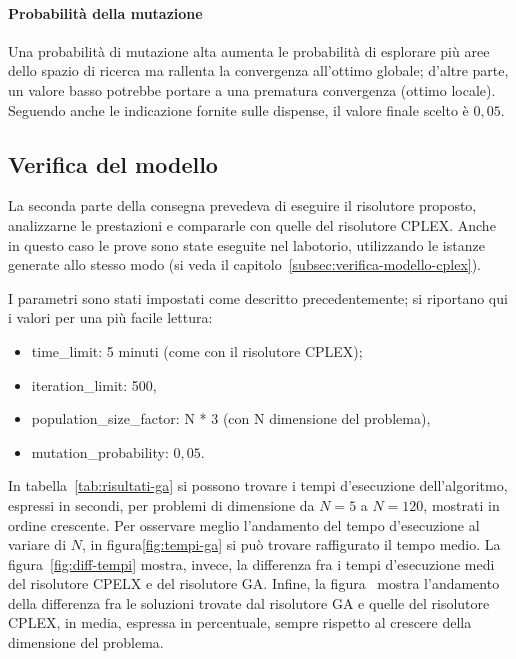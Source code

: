 \paragraph{Probabilità della mutazione}
Una probabilità di mutazione alta aumenta le probabilità di esplorare più aree dello spazio di ricerca
ma rallenta la convergenza all'ottimo globale; d'altre parte, un valore basso potrebbe portare a una prematura convergenza (ottimo locale).
Seguendo anche le indicazione fornite sulle dispense, il valore finale scelto è $0,05$.
\subsection{Verifica del modello}\label{subsec:risultati-ga}
La seconda parte della consegna prevedeva di eseguire il risolutore proposto, analizzarne le prestazioni
e compararle con quelle del risolutore CPLEX.
Anche in questo caso le prove sono state eseguite nel labotorio, utilizzando le istanze generate
allo stesso modo (si veda il capitolo~\ref{subsec:verifica-modello-cplex}).

I parametri sono stati impostati come descritto precedentemente; si riportano qui i valori per una più facile lettura:
\begin{itemize}
	\item \textsf{time\_limit}: 5 minuti (come con il risolutore CPLEX);
	\item \textsf{iteration\_limit}: 500,
	\item \textsf{population\_size\_factor}: N * 3 (con N dimensione del problema),
	\item \textsf{mutation\_probability}: $0,05$.
\end{itemize}
In tabella~\ref{tab:risultati-ga} si possono trovare i tempi d'esecuzione dell'algoritmo, espressi in secondi, per
problemi di dimensione da $N=5$ a $N=120$, mostrati in ordine crescente.
Per osservare meglio l'andamento del tempo d'esecuzione al variare di $N$, in figura\ref{fig:tempi-ga}
si può trovare raffigurato il tempo medio.
La figura~\ref{fig:diff-tempi} mostra, invece, la differenza fra i tempi d'esecuzione medi del risolutore
CPELX e del risolutore GA.
Infine, la figura~\label{fig:gap-sol} mostra l'andamento della differenza fra le soluzioni trovate
dal risolutore GA e quelle del risolutore CPLEX, in media, espressa in percentuale, sempre rispetto
al crescere della dimensione del problema.

